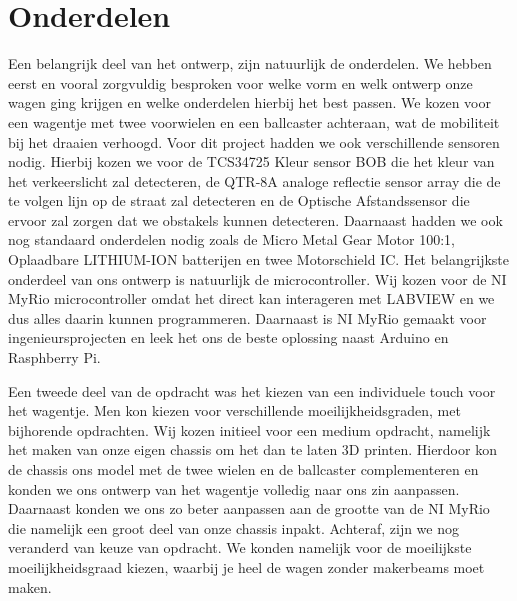 \documentclass[twoside,kulak]{kulakreport} %
\begin{document}
		
	\section{Onderdelen}
	Een belangrijk deel van het ontwerp, zijn natuurlijk de onderdelen. We hebben eerst en vooral zorgvuldig besproken voor welke vorm en welk ontwerp onze wagen ging krijgen en welke onderdelen hierbij het best passen. We kozen voor een wagentje met twee voorwielen en een ballcaster achteraan, wat de mobiliteit bij het draaien verhoogd. Voor dit project hadden we ook verschillende sensoren nodig. Hierbij kozen we voor de TCS34725 Kleur sensor BOB die het kleur van het verkeerslicht zal detecteren, de QTR-8A analoge reflectie sensor array die de te volgen lijn op de straat zal detecteren en de Optische Afstandssensor die ervoor zal zorgen dat we obstakels kunnen detecteren. Daarnaast hadden we ook nog standaard onderdelen nodig zoals de Micro Metal Gear Motor 100:1, Oplaadbare LITHIUM-ION batterijen en twee Motorschield IC. Het belangrijkste onderdeel van ons ontwerp is natuurlijk de microcontroller. Wij kozen voor de NI MyRio microcontroller omdat het direct kan interageren met LABVIEW en we dus alles daarin kunnen programmeren. Daarnaast is NI MyRio gemaakt voor ingenieursprojecten en leek het ons de beste oplossing naast Arduino en Rasphberry Pi.  

	
	Een tweede deel van de opdracht was het kiezen van een individuele touch voor het wagentje. Men kon kiezen voor verschillende moeilijkheidsgraden, met bijhorende opdrachten. Wij kozen initieel voor een medium opdracht, namelijk het maken van onze eigen chassis om het dan te laten 3D printen. Hierdoor kon de chassis ons model met de twee wielen en de ballcaster complementeren en konden we ons ontwerp van het wagentje volledig naar ons zin aanpassen. Daarnaast konden we ons zo beter aanpassen aan de grootte van de NI MyRio die namelijk een groot deel van onze chassis inpakt. Achteraf, zijn we nog veranderd van keuze van opdracht. We konden namelijk voor de moeilijkste moeilijkheidsgraad kiezen, waarbij je heel de wagen zonder makerbeams moet maken. 
\end{document}
